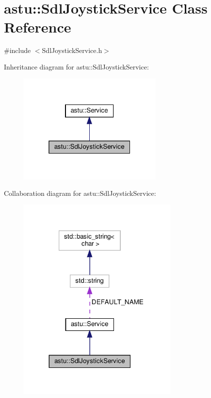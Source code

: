 \hypertarget{classastu_1_1SdlJoystickService}{}\section{astu\+:\+:Sdl\+Joystick\+Service Class Reference}
\label{classastu_1_1SdlJoystickService}


{\ttfamily \#include $<$Sdl\+Joystick\+Service.\+h$>$}



Inheritance diagram for astu\+:\+:Sdl\+Joystick\+Service\+:\nopagebreak
\begin{figure}[H]
\begin{center}
\leavevmode
\includegraphics[width=205pt]{classastu_1_1SdlJoystickService__inherit__graph}
\end{center}
\end{figure}


Collaboration diagram for astu\+:\+:Sdl\+Joystick\+Service\+:\nopagebreak
\begin{figure}[H]
\begin{center}
\leavevmode
\includegraphics[width=227pt]{classastu_1_1SdlJoystickService__coll__graph}
\end{center}
\end{figure}
